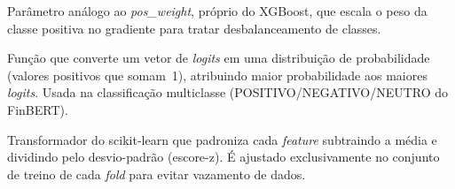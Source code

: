 \begin{description}[style=nextline,leftmargin=0pt,labelindent=0pt]
\item[\textit{scale\_pos\_weight}] Parâmetro análogo ao \textit{pos\_weight}, próprio do XGBoost, que escala o peso da classe positiva no gradiente para tratar desbalanceamento de classes.

\item[\textit{Softmax}] Função que converte um vetor de \textit{logits} em uma distribuição de probabilidade (valores positivos que somam~1), atribuindo maior probabilidade aos maiores \textit{logits}. Usada na classificação multiclasse (POSITIVO/NEGATIVO/NEUTRO do FinBERT).

\item[\textit{StandardScaler}] Transformador do scikit-learn que padroniza cada \textit{feature} subtraindo a média e dividindo pelo desvio-padrão (escore-z). É ajustado exclusivamente no conjunto de treino de cada \textit{fold} para evitar vazamento de dados.

\end{description}
